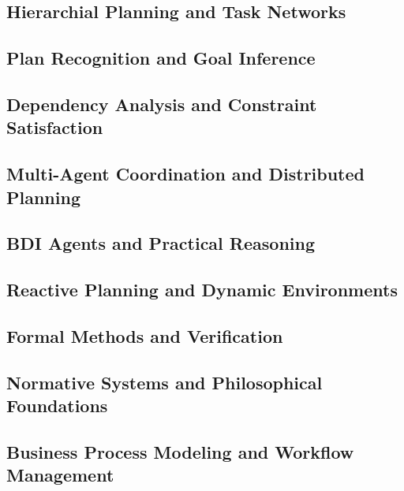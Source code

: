\documentclass[a4paper,11pt]{lmcs}
\begin{document}
\subsection{Hierarchial Planning and Task Networks}
\subsection{Plan Recognition and Goal Inference}
\subsection{Dependency Analysis and Constraint Satisfaction}
\subsection{Multi-Agent Coordination and Distributed Planning}
\subsection{BDI Agents and Practical Reasoning}
\subsection{Reactive Planning and Dynamic Environments}
\subsection{Formal Methods and Verification}
\subsection{Normative Systems and Philosophical Foundations}
\subsection{Business Process Modeling and Workflow Management}
\end{document}

